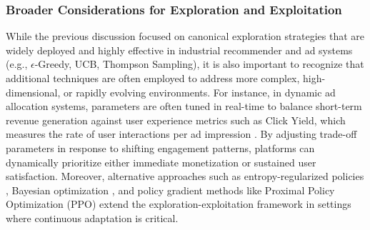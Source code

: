 \documentclass[final]{anthology-ch}         %
\begin{document}
\subsubsection{\textbf{Broader Considerations for Exploration and Exploitation}}
While the previous discussion focused on canonical exploration strategies that are widely deployed and highly effective in industrial recommender and ad systems (e.g., $\epsilon$-Greedy, UCB, Thompson Sampling), it is also important to recognize that additional techniques are often employed to address more complex, high-dimensional, or rapidly evolving environments. For instance, in dynamic ad allocation systems, parameters are often tuned in real-time to balance short-term revenue generation against user experience metrics such as Click Yield, which measures the rate of user interactions per ad impression \cite{zhang2018whole}. By adjusting trade-off parameters in response to shifting engagement patterns, platforms can dynamically prioritize either immediate monetization or sustained user satisfaction. Moreover, alternative approaches such as entropy-regularized policies \cite{mnih2016asynchronous}, Bayesian optimization \cite{shahriari2015taking}, and policy gradient methods like Proximal Policy Optimization (PPO) \cite{schulman2017proximal} extend the exploration-exploitation framework in settings where continuous adaptation is critical.




\end{document}
